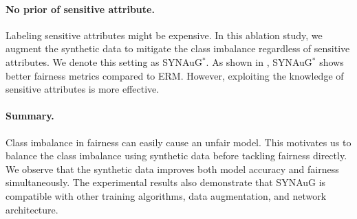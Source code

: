 \paragraph{No prior of sensitive attribute.}
Labeling sensitive attributes might be expensive.
In this ablation study, we augment the synthetic data to mitigate the class imbalance regardless of sensitive attributes.
We denote this setting as SYNAuG$^*$.
As shown in , SYNAuG$^*$ shows better fairness metrics compared to ERM.
However, exploiting the knowledge of sensitive attributes is more effective.

\paragraph{Summary.} 
Class imbalance in fairness can easily cause an unfair model.
This motivates us to balance the class imbalance using synthetic data before tackling fairness directly.
We observe that the synthetic data improves both model accuracy and fairness simultaneously.
The experimental results also demonstrate that SYNAuG is compatible with other training algorithms, data augmentation, and network architecture.


